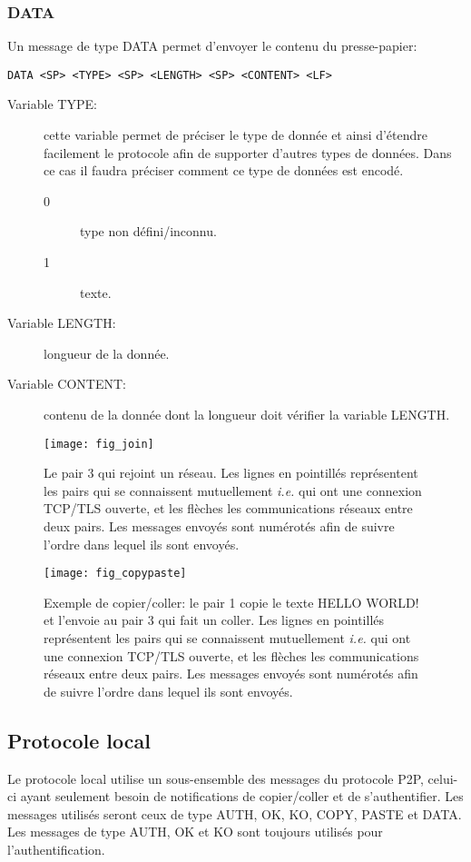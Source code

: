\subsubsection*{DATA}
Un message de type DATA permet d'envoyer le contenu du presse-papier:
\begin{verbatim}
DATA <SP> <TYPE> <SP> <LENGTH> <SP> <CONTENT> <LF>
\end{verbatim}
\begin{description}
\item[Variable TYPE:] cette variable permet de préciser le type
  de donnée et ainsi d'étendre facilement le protocole afin de supporter
  d'autres types de données. Dans ce cas il faudra préciser comment ce type
  de données est encodé.
  \begin{description}
  \item[0] type non défini/inconnu.
  \item[1] texte.
  \end{description}
\item[Variable LENGTH:] longueur de la donnée.
\item[Variable CONTENT:] contenu de la donnée dont la longueur
  doit vérifier la variable LENGTH.
\end{description}

\begin{figure}[!h]
  \centering
  \texttt{[image: fig\_join]}
  \caption{Le pair 3 qui rejoint un réseau. Les lignes en pointillés
    représentent les pairs qui se connaissent mutuellement \emph{i.e.} qui ont
    une connexion TCP/TLS ouverte, et les flèches les communications réseaux
    entre deux pairs. Les messages envoyés sont numérotés afin de suivre
    l'ordre dans lequel ils sont envoyés.}
  \label{fig:join}
\end{figure}

\begin{figure}[!h]
  \centering
  \texttt{[image: fig\_copypaste]}
  \caption{Exemple de copier/coller: le pair 1 copie le texte HELLO WORLD!
    et l'envoie au pair 3 qui fait un coller. Les lignes en pointillés
    représentent les pairs qui se connaissent mutuellement \emph{i.e.} qui ont
    une connexion TCP/TLS ouverte, et les flèches les communications réseaux
    entre deux pairs. Les messages envoyés sont numérotés afin de suivre
    l'ordre dans lequel ils sont envoyés.}
  \label{fig:copypaste}
\end{figure}

\subsection{Protocole local}
Le protocole local utilise un sous-ensemble des messages du protocole P2P,
celui-ci ayant seulement besoin de notifications de copier/coller et de
s'authentifier.
Les messages utilisés seront ceux de type AUTH, OK, KO, COPY, PASTE et DATA.
Les messages de type AUTH, OK et KO sont toujours utilisés pour
l'authentification.

